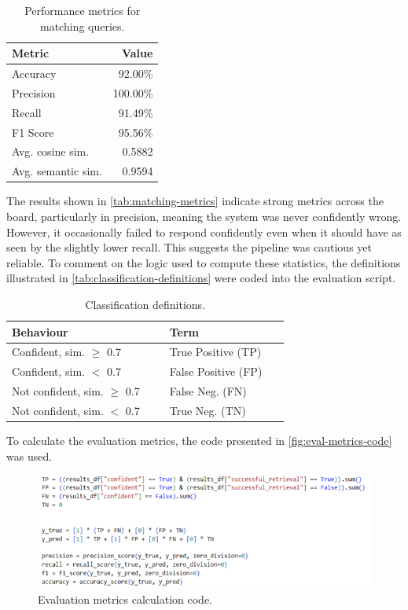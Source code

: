 \documentclass[11pt]{article}
\begin{document}
\begin{table}[t]
  \centering
  \begin{tabular}{lr}
    \textbf{Metric} & \textbf{Value} \\
    \hline
    Accuracy & 92.00\% \\
    Precision & 100.00\% \\
    Recall & 91.49\% \\
    F1 Score & 95.56\% \\
    Avg. cosine sim. & 0.5882 \\
    Avg. semantic sim. & 0.9594 \\
  \end{tabular}
  \caption{Performance metrics for matching queries.}
  \label{tab:matching-metrics}
\end{table}

The results shown in \autoref{tab:matching-metrics} indicate strong metrics across the board, particularly in precision, meaning the system was never confidently wrong. However, it occasionally failed to respond confidently even when it should have as seen by the slightly lower recall. This suggests the pipeline was cautious yet reliable.
To comment on the logic used to compute these statistics, the definitions illustrated in \autoref{tab:classification-definitions} were coded into the evaluation script.

\begin{table}[t]
  \centering
  \begin{tabular}{p{0.50\linewidth}p{0.38\linewidth}}
    \textbf{Behaviour} & \textbf{Term} \\
    \hline
    Confident, sim. $\geq$ 0.7 & True Positive (TP) \\
    Confident, sim. $<$ 0.7 & False Positive (FP) \\
    Not confident, sim. $\geq$ 0.7 & False Neg. (FN) \\
    Not confident, sim. $<$ 0.7 & True Neg. (TN) \\
  \end{tabular}
  \caption{Classification definitions.}
  \label{tab:classification-definitions}
\end{table}

To calculate the evaluation metrics, the code presented in \autoref{fig:eval-metrics-code} was used.

\begin{figure}[t]
  \centering
  \includegraphics[width=\linewidth]{img/eval_metrics_code.png}
  \caption{Evaluation metrics calculation code.}
  \label{fig:eval-metrics-code}
\end{figure}
\end{document}
